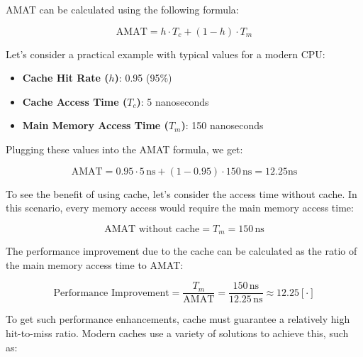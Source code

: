 \noindent AMAT can be calculated using the following formula:

\[
\text{AMAT} = h \cdot T_c + (1 - h) \cdot T_m
\]

\noindent Let's consider a practical example with typical values for a modern CPU:

\begin{itemize}
    \item \textbf{Cache Hit Rate ($h$)}: 0.95 (95\%) \cite{comparchaquant}
    \item \textbf{Cache Access Time ($T_c$)}: 5 nanoseconds \cite{Patterson2013}
    \item \textbf{Main Memory Access Time ($T_m$)}: 150 nanoseconds \cite{Hamacher2011}
\end{itemize}

\noindent Plugging these values into the AMAT formula, we get:

\[
\text{AMAT} = 0.95 \cdot 5 \, \text{ns} + (1 - 0.95) \cdot 150 \, \text{ns} = 12.25 \text{ns} %
\]

\noindent To see the benefit of using cache, let's consider the access time without cache. In this scenario, every memory access would require the main memory access time:

\[
\text{AMAT without cache} = T_m = 150 \, \text{ns}
\]

\noindent The performance improvement due to the cache can be calculated as the ratio of the main memory access time to AMAT:

\[
\text{Performance Improvement} = \frac{T_m}{\text{AMAT}} = \frac{150 \, \text{ns}}{12.25 \, \text{ns}} \approx 12.25 [\cdot]
\]

\vspace{10px} \noindent To get such performance enhancements, cache must guarantee a relatively high hit-to-miss ratio. Modern caches use a variety of solutions to achieve this, such as:

